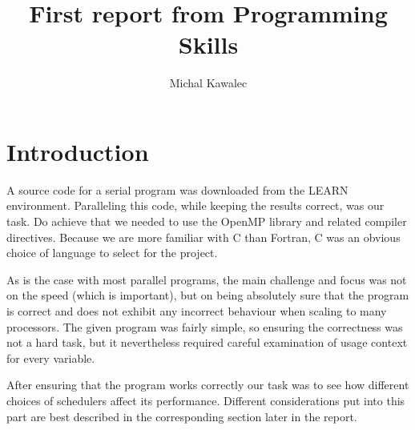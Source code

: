 \documentclass[11pt,a4paper]{article}
\begin{document}
\title{First report from Programming Skills}
\author{Michal Kawalec}
\maketitle

\section{Introduction}
A source code for a serial program was downloaded from the LEARN environment. Paralleling this code, while keeping the results correct, was our task. Do achieve that we needed to use the OpenMP library and related compiler directives. Because we are more familiar with C than Fortran, C was an obvious choice of language to select for the project. 

As is the case with most parallel programs, the main challenge and focus was not on the speed (which is important), but on being absolutely sure that the program is correct and does not exhibit any incorrect behaviour when scaling to many processors. The given program was fairly simple, so ensuring the correctness was not a hard task, but it nevertheless required careful examination of usage context for every variable.

After ensuring that the program works correctly our task was to see how different choices of schedulers affect its performance. Different considerations put into this part are best described in the corresponding section later in the report.
\end{document}
